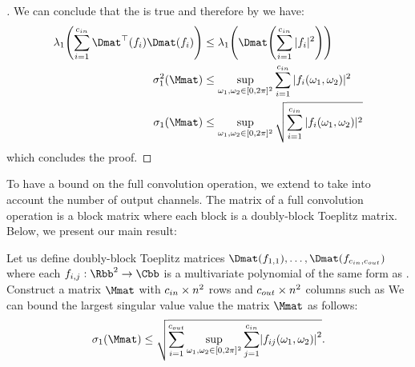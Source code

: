 \begin{proof}[]
\noindent
We can conclude that the  is true and therefore by  we have:
\begin{align}
  \lambda_1 \left( \sum_{i=1}^{\cin} \Dmat^{\top} \left(f_i \right) \Dmat (f_i) \right) &\leq \lambda_1 \left( \Dmat \left( \sum_{i=1}^{\cin} |f_i|^2 \right) \right) \\
  \sigma_1^2 \left( \Mmat \right) &\leq \sup_{\omega_1, \omega_2 \in [0, 2\pi]^2} \sum_{i=1}^{\cin} |f_i(\omega_1, \omega_2)|^2 \\
  \sigma_1 \left( \Mmat \right) &\leq \sup_{\omega_1, \omega_2 \in [0, 2\pi]^2} \sqrt{ \sum_{i=1}^{\cin} |f_i(\omega_1, \omega_2)|^2 }
\end{align}
which concludes the proof. 
\end{proof}

\endgroup


To have a bound on the full convolution operation, we extend  to take into account the number of output channels.
The matrix of a full convolution operation is a block matrix where each block is a doubly-block Toeplitz matrix.
Below, we present our main result:

\begin{maintheorem} \label{theorem:ch5-bound_max_sv_convolution} 
  Let us define doubly-block Toeplitz matrices $\Dmat(f_{1, 1}), \dots, \Dmat(f_{\cin, \cout})$ where each $f_{i,j}: \Rbb^2 \rightarrow \Cbb$ is a multivariate polynomial of the same form as .
  Construct a matrix $\Mmat$ with $c_{in}\times n^2$ rows and $c_{out}\times n^2$ columns such as
  We can bound the largest singular value value the matrix $\Mmat$ as follows: 
  \begin{equation} \label{equation:lipbound_sv}
     \sigma_1 \left( \Mmat \right) \leq \sqrt{ \sum_{i=1}^{\cout} \sup_{\omega_1, \omega_2 \in [0, 2\pi]^2} \sum_{j = 1}^{\cin} \left|f_{ij}(\omega_1, \omega_2) \right|^2 } .
  \end{equation} 
\end{maintheorem}

